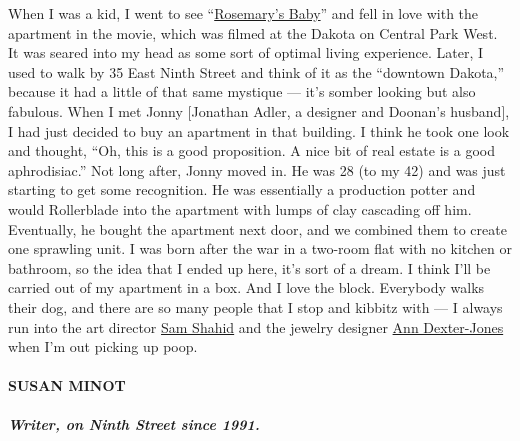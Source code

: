 When I was a kid, I went to see
``\href{https://www.nytimes.com/watching/recommendations/watching-film-rosemarys-baby}{Rosemary's
Baby}'' and fell in love with the apartment in the movie, which was
filmed at the Dakota on Central Park West. It was seared into my head as
some sort of optimal living experience. Later, I used to walk by 35 East
Ninth Street and think of it as the ``downtown Dakota,'' because it had
a little of that same mystique --- it's somber looking but also
fabulous. When I met Jonny {[}Jonathan Adler, a designer and Doonan's
husband{]}, I had just decided to buy an apartment in that building. I
think he took one look and thought, ``Oh, this is a good proposition. A
nice bit of real estate is a good aphrodisiac.'' Not long after, Jonny
moved in. He was 28 (to my 42) and was just starting to get some
recognition. He was essentially a production potter and would
Rollerblade into the apartment with lumps of clay cascading off him.
Eventually, he bought the apartment next door, and we combined them to
create one sprawling unit. I was born after the war in a two-room flat
with no kitchen or bathroom, so the idea that I ended up here, it's sort
of a dream. I think I'll be carried out of my apartment in a box. And I
love the block. Everybody walks their dog, and there are so many people
that I stop and kibbitz with --- I always run into the art director
\href{https://www.nytimes.com/2015/03/17/t-magazine/behind-sam-shahids-closed-doors.html}{Sam
Shahid} and the jewelry designer
\href{http://anndexterjonesdesign.com/About/}{Ann Dexter-Jones} when I'm
out picking up poop.

\hypertarget{susan-minot}{%
\paragraph{SUSAN MINOT}\label{susan-minot}}

\hypertarget{writer-on-ninth-street-since-1991}{%
\subparagraph{\texorpdfstring{\textbf{Writer, on Ninth Street since
1991.}}{Writer, on Ninth Street since 1991.}}\label{writer-on-ninth-street-since-1991}}

